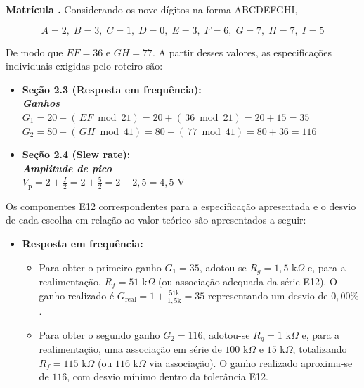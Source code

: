 \documentclass[11pt,a4paper]{article}
\begin{document}
\begin{espec}

\textbf{Matrícula .} Considerando os nove dígitos na forma ABCDEFGHI,

\begin{equation}
    A=2,\; B=3,\; C=1,\; D=0,\; E=3,\; F=6,\; G=7,\; H=7,\; I=5
\end{equation}

De modo que $EF=36$ e $GH=77$. A partir desses valores, as especificações individuais exigidas pelo roteiro são:

\begin{itemize}
    \item \textbf{Seção 2.3 (Resposta em frequência):} \\
    \textbf{\textit{Ganhos}} \\
    $G_1=20+(\,EF\bmod 21)=20+(\,36\bmod 21)=20+15=35$ \\
    $G_2=80+(\,GH\bmod 41)=80+(\,77\bmod 41)=80+36=116$

    \vspace{0.3cm}
    
    \item \textbf{Seção 2.4 (Slew rate):} \\
    \textbf{\textit{Amplitude de pico}} \\
    $V_{\text{p}}=2+\frac{I}{2}=2+\frac{5}{2}=2+2{,}5=4{,}5\text{ V}$
\end{itemize}

\end{espec}

Os componentes E12 correspondentes para a especificação apresentada e o desvio de cada escolha em relação ao valor teórico são apresentados a seguir:

\begin{itemize}

    \item \textbf{Resposta em frequência:} 
    \begin{itemize}
    
        \item Para obter o primeiro ganho $G_1=35$, adotou-se $R_g=1{,}5\text{ k}\Omega$ e, para a realimentação, $R_f=51\text{ k}\Omega$ (ou associação adequada da série E12). O ganho realizado é $G_{\text{real}}=1+\frac{51\text{k}}{1{,}5\text{k}} = 35$ representando um desvio de $0{,}00\%$.
        
        \item Para obter o segundo ganho $G_2=116$, adotou-se $R_g=1\text{ k}\Omega$ e, para a realimentação, uma associação em série de $100\text{ k}\Omega$ e $15\text{ k}\Omega$, totalizando $R_f=115\text{ k}\Omega$ (ou $116\text{ k}\Omega$ via associação). O ganho realizado aproxima-se de $116$, com desvio mínimo dentro da tolerância E12.
        
    \end{itemize}
\end{itemize}
\end{document}
